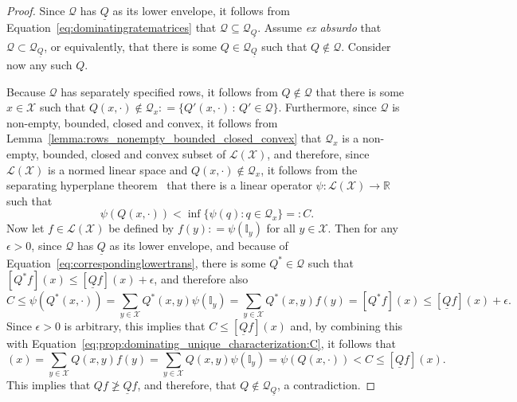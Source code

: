 \documentclass[10pt,a4paper]{paper}
\theoremstyle{definition}
\newcommand{\reals}{\mathbb{R}}
\newcommand{\states}{\mathcal{X}}
\newcommand{\gambles}{\mathcal{L}}
\newcommand{\gamblesX}{\gambles(\states)}
\newcommand{\ind}[1]{\mathbb{I}_{#1}}
\newcommand{\rateset}{\mathcal{Q}}
\newcommand{\lrate}{\underline{Q}}
\newcommand{\coloneqq}{:\!=}
\begin{document}
\propdominatinguniquecharacterization*
\begin{proof}
Since $\rateset$ has $\lrate$ as its lower envelope, it follows from Equation~\eqref{eq:dominatingratematrices} that $\rateset\subseteq\rateset_{\lrate}$. Assume \emph{ex absurdo} that $\rateset\subset\rateset_{\lrate}$, or equivalently, that there is some $Q\in\rateset_{\lrate}$ such that $Q\notin\rateset$. Consider now any such $Q$.

Because $\rateset$ has separately specified rows, it follows from $Q\notin\rateset$ that there is some $x\in\states$ such that $Q(x,\cdot)\notin\rateset_x\coloneqq\{Q'(x,\cdot)\,:\,Q'\in\rateset\}$. Furthermore, since $\rateset$ is non-empty, bounded, closed and convex, it follows from Lemma~\ref{lemma:rows_nonempty_bounded_closed_convex} that $\rateset_x$ is a non-empty, bounded, closed and convex subset of $\gamblesX$, and therefore, since $\gamblesX$ is a normed linear space and $Q(x,\cdot)\notin\rateset_x$, it follows from the separating hyperplane theorem~\cite[Chapter 14, Corollary 25]{Royden:2010vn} that there is a linear operator $\psi\colon\gamblesX\to\reals$ such that
\begin{equation}\label{eq:prop:dominating_unique_characterization:C}
\psi(Q(x,\cdot))<\inf\{\psi(q)\colon q\in\rateset_x\}=\colon C.
\end{equation}
Now let $f\in\gamblesX$ be defined by $f(y)\coloneqq\psi(\ind{y})$ for all $y\in\states$. Then for any $\epsilon>0$, since $\rateset$ has $\lrate$ as its lower envelope, and because of Equation~\eqref{eq:correspondinglowertrans}, there is some $Q^*\in\rateset$ such that $[Q^*f](x)\leq[\lrate f](x)+\epsilon$, and therefore also
\begin{equation*}
C
\leq\psi(Q^*(x,\cdot))
=\sum_{y\in\states}Q^*(x,y)\psi(\ind{y})
=\sum_{y\in\states}Q^*(x,y)f(y)
=[Q^* f](x)\leq[\lrate f](x)+\epsilon.
\end{equation*}
Since $\epsilon>0$ is arbitrary, this implies that $C\leq[\lrate f](x)$ and, by combining this with Equation~\eqref{eq:prop:dominating_unique_characterization:C}, it follows that
\begin{equation*}
[Qf](x)
=\sum_{y\in\states}Q(x,y)f(y)
=\sum_{y\in\states}Q(x,y)\psi(\ind{y})
=\psi(Q(x,\cdot))
<C\leq[\lrate f](x).
\end{equation*}
This implies that $Qf\not\geq\lrate f$, and therefore, that $Q\notin\rateset_{\lrate}$, a contradiction.
\end{proof}
\end{document}
